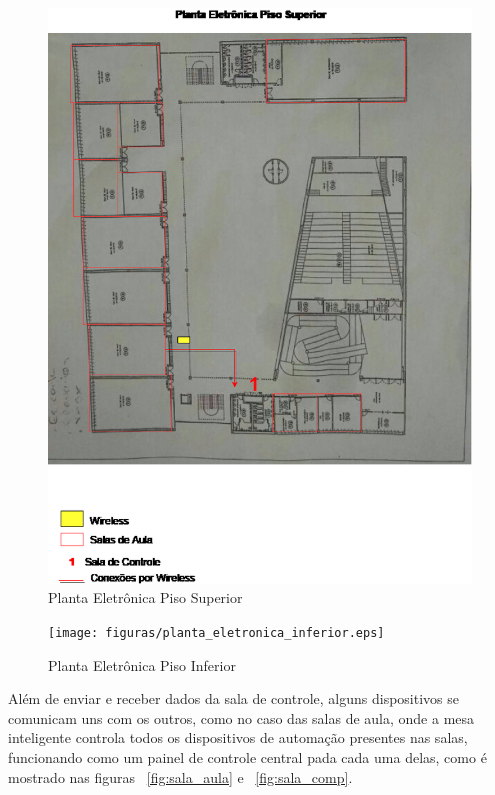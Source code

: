 \begin{figure}[!ht]
  \centering
  \includegraphics[keepaspectratio=true,scale=0.4]{figuras/planta_eletronica_superior.eps}
  \caption{Planta Eletrônica Piso Superior}
  \label{fig:plant_sup}
\end{figure}

\begin{figure}[!ht]
  \centering
  \texttt{[image: figuras/planta\_eletronica\_inferior.eps]}
  \caption{Planta Eletrônica Piso Inferior}
  \label{fig:plant_inf}
\end{figure}

Além de enviar e receber dados da sala de controle, alguns dispositivos se comunicam uns com os outros, como no caso das salas de aula, onde a mesa inteligente controla todos os dispositivos de automação presentes nas salas, funcionando como um painel de controle central pada cada uma delas, como é mostrado nas figuras ~\ref{fig:sala_aula} e ~\ref{fig:sala_comp}.

